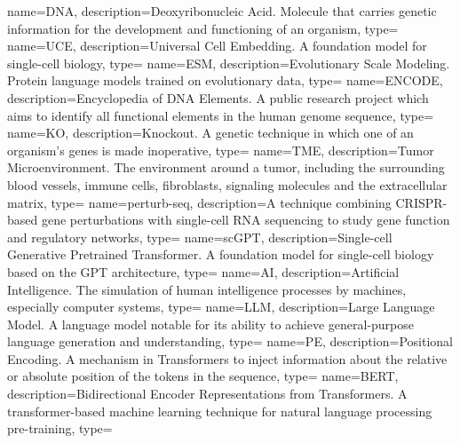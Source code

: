 {
    name={DNA},
    description={Deoxyribonucleic Acid. Molecule that carries genetic information for the development and functioning of an organism},
    type=\acronymtype
}
{
    name={UCE},
    description={Universal Cell Embedding. A foundation model for single-cell biology},
    type=\acronymtype
}
{
    name={ESM},
    description={Evolutionary Scale Modeling. Protein language models trained on evolutionary data},
    type=\acronymtype
}
{
    name={ENCODE},
    description={Encyclopedia of DNA Elements. A public research project which aims to identify all functional elements in the human genome sequence},
    type=\acronymtype
}
{
    name={KO},
    description={Knockout. A genetic technique in which one of an organism's genes is made inoperative},
    type=\acronymtype
}
{
    name={TME},
    description={Tumor Microenvironment. The environment around a tumor, including the surrounding blood vessels, immune cells, fibroblasts, signaling molecules and the extracellular matrix},
    type=\acronymtype
}
{
    name={perturb-seq},
    description={A technique combining CRISPR-based gene perturbations with single-cell RNA sequencing to study gene function and regulatory networks},
    type=\acronymtype
}
{
    name={scGPT},
    description={Single-cell Generative Pretrained Transformer. A foundation model for single-cell biology based on the GPT architecture},
    type=\acronymtype
}
{
    name={AI},
    description={Artificial Intelligence. The simulation of human intelligence processes by machines, especially computer systems},
    type=\acronymtype
}
{
    name={LLM},
    description={Large Language Model. A language model notable for its ability to achieve general-purpose language generation and understanding},
    type=\acronymtype
}
{
    name={PE},
    description={Positional Encoding. A mechanism in Transformers to inject information about the relative or absolute position of the tokens in the sequence},
    type=\acronymtype
}
{
    name={BERT},
    description={Bidirectional Encoder Representations from Transformers. A transformer-based machine learning technique for natural language processing pre-training},
    type=\acronymtype
}
